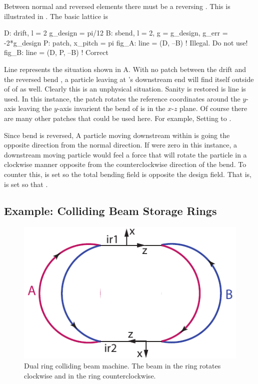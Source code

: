 Between normal and reversed elements there must be a reversing . 
This is illustrated in . The basic lattice is
\begin{example}
  D: drift, l = 2
  g_design = pi/12
  B: sbend, l = 2, g = g_design, g_err = -2*g_design
  P: patch, x_pitch = pi
  fig_A: line = (D, --B)     ! Illegal. Do not use!
  fig_B: line = (D, P, --B)  ! Correct
\end{example}
Line  represents the situation shown in
A.  With no patch between the drift  and
the reversed bend , a particle leaving  at 's
downstream end will find itself outside of of  as well. Clearly
this is an unphysical situation. Sanity is restored is line 
is used. In this instance, the patch  rotates the reference
coordinates around the $y$-axis leaving the $y$-axis invarient the
bend of  is in the $x$-$z$ plane. Of course there are many other
patches that could be used here. For example, Setting  to
. 

Since bend  is reversed, A particle moving downstream within
 is going the opposite direction from the normal direction. If
 were zero in this instance, a downstream moving particle
would feel a force that will rotate the particle in a clockwise manner
opposite from the counterclockwise direction of the bend. To counter
this,  is set so the total bending field  is opposite the design field. That is,  is set so
that .

\subsection{Example: Colliding Beam Storage Rings}
\label{s:ex.collide}

\begin{figure}[tb]
  \centering
  \includegraphics[width=5in]{colliding-beams.pdf}
  \caption[Dual ring colliding beam machine]{Dual ring colliding beam machine. 
The beam in the  ring rotates clockwise and in the  ring
counterclockwise.}
  \label{f:collide}
\end{figure}

